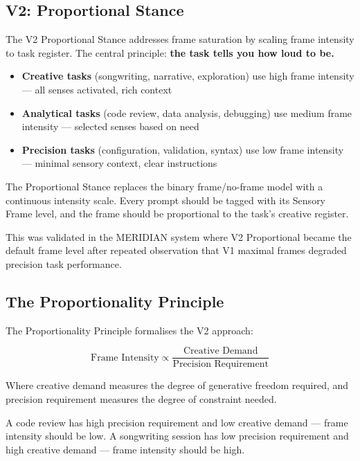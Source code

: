 \documentclass[11pt,a4paper]{article}
\begin{document}
\subsection{V2: Proportional Stance}

The V2 Proportional Stance addresses frame saturation by scaling frame intensity to task register. The central principle: \textbf{the task tells you how loud to be.}

\begin{itemize}
    \item \textbf{Creative tasks} (songwriting, narrative, exploration) use high frame intensity --- all senses activated, rich context
    \item \textbf{Analytical tasks} (code review, data analysis, debugging) use medium frame intensity --- selected senses based on need
    \item \textbf{Precision tasks} (configuration, validation, syntax) use low frame intensity --- minimal sensory context, clear instructions
\end{itemize}

The Proportional Stance replaces the binary frame/no-frame model with a continuous intensity scale. Every prompt should be tagged with its Sensory Frame level, and the frame should be proportional to the task's creative register.

This was validated in the MERIDIAN system where V2 Proportional became the default frame level after repeated observation that V1 maximal frames degraded precision task performance.

\subsection{The Proportionality Principle}

The Proportionality Principle formalises the V2 approach:

\begin{equation}
\text{Frame Intensity} \propto \frac{\text{Creative Demand}}{\text{Precision Requirement}}
\end{equation}

Where creative demand measures the degree of generative freedom required, and precision requirement measures the degree of constraint needed.

A code review has high precision requirement and low creative demand --- frame intensity should be low. A songwriting session has low precision requirement and high creative demand --- frame intensity should be high.
\end{document}
